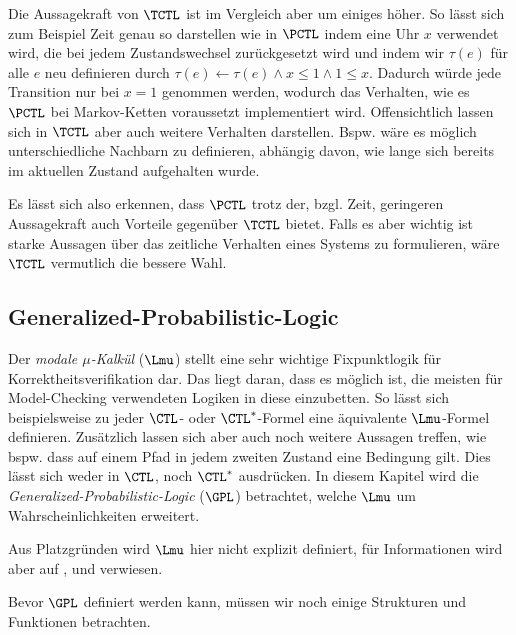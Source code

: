 Die Aussagekraft von $\TCTL$ ist im Vergleich aber um einiges höher.
So lässt sich zum Beispiel Zeit genau so darstellen wie in $\PCTL$ indem eine Uhr $x$ verwendet wird, die bei jedem Zustandswechsel zurückgesetzt wird und indem wir $\tau(e)$ für alle $e$ neu definieren durch $\tau(e)\gets \tau(e) \land x\leq 1 \land 1\leq x$.
Dadurch würde jede Transition nur bei $x=1$ genommen werden, wodurch das Verhalten, wie es $\PCTL$ bei Markov-Ketten voraussetzt implementiert wird.
Offensichtlich lassen sich in $\TCTL$ aber auch weitere Verhalten darstellen.
Bspw. wäre es möglich unterschiedliche Nachbarn zu definieren, abhängig davon, wie lange sich bereits im aktuellen Zustand aufgehalten wurde.

Es lässt sich also erkennen, dass $\PCTL$ trotz der, bzgl. Zeit, geringeren Aussagekraft auch Vorteile gegenüber $\TCTL$ bietet.
Falls es aber wichtig ist starke Aussagen über das zeitliche Verhalten eines Systems zu formulieren, wäre $\TCTL$ vermutlich die bessere Wahl.


\subsection{Generalized-Probabilistic-Logic}

Der \textit{modale $\mu$-Kalkül} ($\Lmu$) stellt eine sehr wichtige Fixpunktlogik für Korrektheitsverifikation dar.
Das liegt daran, dass es möglich ist, die meisten für Model-Checking verwendeten Logiken in diese einzubetten. So lässt sich beispielsweise zu jeder $\CTL$- oder $\CTL^*$-Formel eine äquivalente $\Lmu$-Formel definieren.
Zusätzlich lassen sich aber auch noch weitere Aussagen treffen, wie bspw. dass auf einem Pfad in jedem zweiten Zustand eine Bedingung gilt.
Dies lässt sich weder in $\CTL$, noch $\CTL^*$ ausdrücken. \cite{cleaveland2005probabilistic}
In diesem Kapitel wird die \textit{Generalized-Probabilistic-Logic} ($\GPL$) betrachtet, welche $\Lmu$ um Wahrscheinlichkeiten erweitert.

Aus Platzgründen wird $\Lmu$ hier nicht explizit definiert, für Informationen wird aber auf \cite{stirling1991local}, \cite{kozen1983results} und \cite{emerson1991real} verwiesen.

Bevor $\GPL$ definiert werden kann, müssen wir noch einige Strukturen und Funktionen betrachten.

